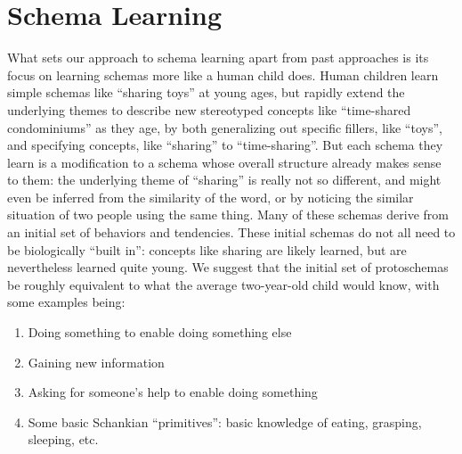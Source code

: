 \section{Schema Learning}
\label{sec:protoschemas}
What sets our approach to schema learning apart from past approaches is its focus on learning schemas more like a human child does. Human children learn simple schemas like ``sharing toys'' at young ages, but rapidly extend the underlying themes to describe new stereotyped concepts like ``time-shared condominiums'' as they age, by both generalizing out specific fillers, like ``toys'', and specifying concepts, like ``sharing'' to ``time-sharing''. But each schema they learn is a modification to a schema whose overall structure already makes sense to them: the underlying theme of ``sharing'' is really not so different, and might even be inferred from the similarity of the word, or by noticing the similar situation of two people using the same thing. Many of these schemas derive from an initial set of behaviors and tendencies. These initial schemas do not all need to be biologically ``built in'': concepts like sharing are likely learned, but are nevertheless learned quite young. We suggest that the initial set of protoschemas be roughly equivalent to what the average two-year-old child would know, with some examples being:

\begin{enumerate}
    \item Doing something to enable doing something else
    \item Gaining new information
    \item Asking for someone's help to enable doing something
    \item Some basic Schankian ``primitives'': basic knowledge of eating, grasping, sleeping, etc.
\end{enumerate}

